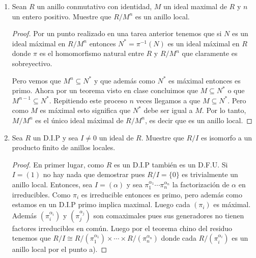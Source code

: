 \documentclass[letter,twoside,12pt]{article}
\begin{document}
\begin{enumerate}
\begin{enumerate}
\item  Sean $ R $ un anillo conmutativo con identidad, $ M $ un ideal maximal de $ R $ y $ n $ un entero positivo.
Muestre que $ R/M^n $ es un anillo local.

\begin{proof}
Por un punto realizado en una tarea anterior tenemos que si $ N $ es un ideal máximal en $ R/M^n $ entonces $N^*=\pi^{-1}(N)$ es un ideal máximal en $ R $ donde $ \pi $ es el homomorfismo natural entre $ R  $ y $ R/M^n $ que claramente es sobreyectivo.

Pero vemos que $M^n \subseteq N^* $ y que además como $ N^* $ es máximal entonces es primo. Ahora por un teorema visto en clase concluimos que $ M  \subseteq N^* $ o que $ M^{n-1} \subseteq N^*$. Repitiendo este proceso $ n $ veces llegamos a que $ M  \subseteq N^* $. Pero como $M$ es máximal esto significa que $ N^* $ debe ser igual a $ M $. Por lo tanto, $ M/M^n $ es el único ideal máximal de $ R/M^n $, es decir que es un anillo local.
\end{proof}

\item  Sea $ R $ un D.I.P y sea $ I \not = 0 $ un ideal de $ R $. Muestre que $ R/I $ es isomorfo a un producto finito de
anillos locales.


\begin{proof}
En primer lugar, como $ R $ es un D.I.P también es un D.F.U. Si $I=(1)$ no hay nada que demostrar pues $ R/I = \{0\}$ es trivialmente un anillo local. Entonces, sea $ I = (\alpha) $ y sea $ \pi_1^{\alpha_1} \cdots \pi_n^{\alpha_n} $ la factorización de $ \alpha $ en irreducibles. Como $ \pi_i $ es irreducible entonces es primo, pero además como estamos en un D.I.P primo implica maximal. Luego cada $ (\pi_i) $ es máximal. Además $ (\pi_i^{\alpha_i}) $ y $ (\pi_j^{\alpha_j}) $ son comaximales pues sus generadores no tienen factores irreducibles en común. Luego por el teorema chino del residuo tenemos que $ R/I \cong R/(\pi_1^{\alpha_1}) \times \cdots \times R/(\pi_n^{\alpha_n})$ donde cada $ R/(\pi_i^{\alpha_i}) $ es un anillo local por el punto a).
\end{proof}
\end{enumerate}
\end{enumerate}
\end{document}
